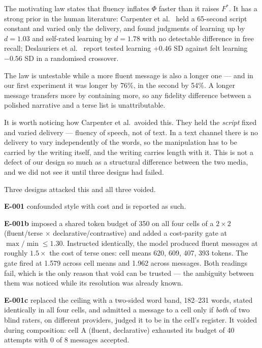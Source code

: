 \documentclass[11pt]{article}
\begin{document}
The motivating law states that fluency inflates $\Phi$ faster than it raises
$F^*$. It has a strong prior in the human literature: Carpenter et
al.~\cite{carpenter2013} held a 65-second script constant and varied only the
delivery, and found judgments of learning up by $d = 1.03$ and self-rated
learning by $d = 1.78$ with no detectable difference in free recall; Deslauriers
et al.~\cite{deslauriers2019} report tested learning $+0.46$ SD against felt
learning $-0.56$ SD in a randomised crossover.

The law is untestable while a more fluent message is also a longer one --- and in
our first experiment it was longer by 76\%, in the second by 54\%. A longer
message transfers more by containing more, so any fidelity difference between a
polished narrative and a terse list is unattributable.

It is worth noticing how Carpenter et al.\ avoided this. They held the
\emph{script} fixed and varied delivery --- fluency of speech, not of text. In a
text channel there is no delivery to vary independently of the words, so the
manipulation has to be carried by the writing itself, and the writing carries
length with it. This is not a defect of our design so much as a structural
difference between the two media, and we did not see it until three designs had
failed.

Three designs attacked this and all three voided.

\textbf{E-001} confounded style with cost and is reported as such.

\textbf{E-001b} imposed a shared token budget of 350 on all four cells of a
$2\times2$ (fluent/terse $\times$ declarative/contrastive) and added a
cost-parity gate at $\max/\min \le 1.30$. Instructed identically, the model
produced fluent messages at roughly $1.5\times$ the cost of terse ones: cell
means 620, 609, 407, 393 tokens. The gate fired at 1.579 across cell means and
1.962 across messages. Both readings fail, which is the only reason that void can
be trusted --- the ambiguity between them was noticed while its resolution was
already known.

\textbf{E-001c} replaced the ceiling with a two-sided word band, 182--231 words,
stated identically in all four cells, and admitted a message to a cell only if
\emph{both} of two blind raters, on different providers, judged it to be in the
cell's register. It voided during composition: cell A (fluent, declarative)
exhausted its budget of 40 attempts with 0 of 8 messages accepted.
\end{document}
